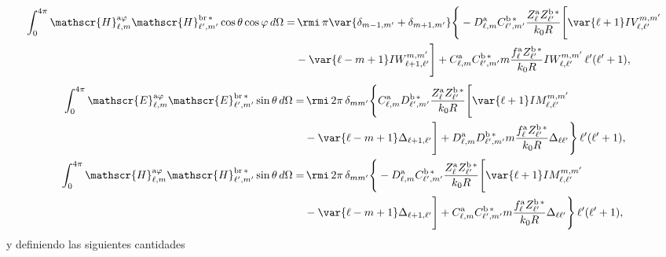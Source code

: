 \begin{align}
%
%
\int_0^{4\pi}\mathscr{H}_{\ell, m}^{\text{a}\varphi}\mathscr{H}_{\ell^{\prime}, m^{\prime}}^{\text{br}\,*}\cos\theta\cos\varphi \, d\Omega
%
 =& \, \rmi \, \pi \var{ \delta_{m-1, m^{\prime}} + \delta_{m+1, m^{\prime}} } \Bigg\{ -D_{\ell, m}^{\rm a} C_{\ell^{\prime}, m^{\prime}}^{\rm b \, *} \frac{Z_{\ell}^{\rm a} Z_{\ell^{\prime}}^{\rm b \, *}}{k_0 R} \Bigg[\var{\ell +1} IV_{\ell, \ell^{\prime}}^{m, m^{\prime}} \nonumber \\ 
% 
&-\var{\ell - m +1} IW_{\ell + 1, \ell^{\prime}}^{m, m^{\prime}} \Bigg]
%
 + C_{\ell, m}^{\rm a} C_{\ell^{\prime}, m^{\prime}}^{\rm b \, *} m \frac{f_{\ell}^{\rm a} Z_{\ell^{\prime}}^{\rm b\, *}}{k_0 R} IW_{\ell, \ell^{\prime}}^{m, m^{\prime}} \, \ell^{\prime}(\ell^{\prime}+1),
% 
%
%
%
\end{align}
\begin{align}
\int_0^{4\pi}\mathscr{E}_{\ell, m}^{\text{a}\varphi}\mathscr{E}_{\ell^{\prime}, m^{\prime}}^{\text{br}\,*}\sin\theta \, d\Omega
%
 =& \, \rmi \, 2\pi \, \delta_{m m^{\prime}} \Bigg\{ C_{\ell, m}^{\rm a} D_{\ell^{\prime}, m^{\prime}}^{\rm b \, *} \frac{Z_{\ell}^{\rm a} Z_{\ell^{\prime}}^{\rm b \, *}}{k_0 R} \Bigg[\var{\ell +1} IM_{\ell, \ell^{\prime}}^{m, m^{\prime}} \nonumber \\ 
% 
&-\var{\ell - m +1} \Delta_{\ell + 1, \ell^{\prime}}  \Bigg]
%
+ D_{\ell, m}^{\rm a} D_{\ell^{\prime}, m^{\prime}}^{\rm b \, *} m \frac{f_{\ell}^{\rm a} Z_{\ell^{\prime}}^{\rm b\, *}}{k_0 R} \Delta_{\ell \ell^{\prime}} \Bigg\} \, \ell^{\prime}(\ell^{\prime}+1),\\
%
%
\int_0^{4\pi}\mathscr{H}_{\ell, m}^{\text{a}\varphi}\mathscr{H}_{\ell^{\prime}, m^{\prime}}^{\text{br}\,*}\sin\theta \, d\Omega
%
 =& \, \rmi \, 2\pi \, \delta_{m m^{\prime}} \Bigg\{ -D_{\ell, m}^{\rm a} C_{\ell^{\prime}, m^{\prime}}^{\rm b \, *} \frac{Z_{\ell}^{\rm a} Z_{\ell^{\prime}}^{\rm b \, *}}{k_0 R} \Bigg[\var{\ell +1} IM_{\ell, \ell^{\prime}}^{m, m^{\prime}} \nonumber \\ 
% 
&-\var{\ell - m +1} \Delta_{\ell + 1, \ell^{\prime}}  \Bigg]
%
+ C_{\ell, m}^{\rm a} C_{\ell^{\prime}, m^{\prime}}^{\rm b \, *} m \frac{f_{\ell}^{\rm a} Z_{\ell^{\prime}}^{\rm b\, *}}{k_0 R} \Delta_{\ell \ell^{\prime}} \Bigg\} \, \ell^{\prime}(\ell^{\prime}+1),
\end{align}
y definiendo las siguientes cantidades
